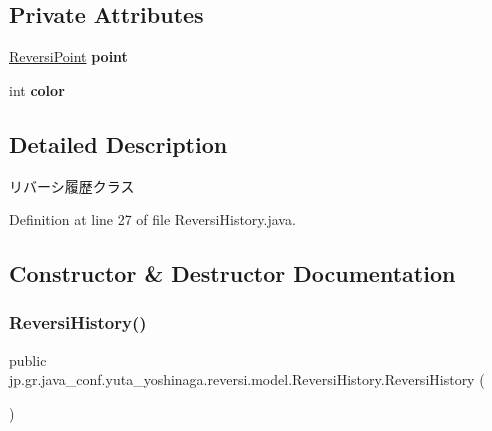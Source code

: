 \subsection*{Private Attributes}
\begin{DoxyCompactItemize}
\item 
\mbox{\label{classjp_1_1gr_1_1java__conf_1_1yuta__yoshinaga_1_1reversi_1_1model_1_1_reversi_history_a7f31cdd1562de0a3a73ba2298f030072}} 
\mbox{\hyperlink{classjp_1_1gr_1_1java__conf_1_1yuta__yoshinaga_1_1reversi_1_1model_1_1_reversi_point}{Reversi\+Point}} {\bfseries point}
\item 
\mbox{\label{classjp_1_1gr_1_1java__conf_1_1yuta__yoshinaga_1_1reversi_1_1model_1_1_reversi_history_a309884e0e91f9573f9a63f000380fc23}} 
int {\bfseries color}
\end{DoxyCompactItemize}


\subsection{Detailed Description}
リバーシ履歴クラス 

Definition at line 27 of file Reversi\+History.\+java.



\subsection{Constructor \& Destructor Documentation}
\mbox{\label{classjp_1_1gr_1_1java__conf_1_1yuta__yoshinaga_1_1reversi_1_1model_1_1_reversi_history_abd0f556489e10b58555304449c6c2682}} 
\subsubsection{\texorpdfstring{Reversi\+History()}{ReversiHistory()}}
{\footnotesize\ttfamily public jp.\+gr.\+java\+\_\+conf.\+yuta\+\_\+yoshinaga.\+reversi.\+model.\+Reversi\+History.\+Reversi\+History (\begin{DoxyParamCaption}{ }\end{DoxyParamCaption})}



